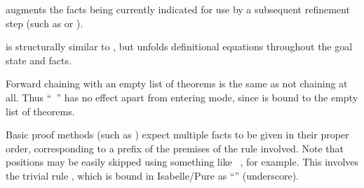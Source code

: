 \begin{isabellebody}
\begin{isamarkuptext}
\begin{descr}
  \item [\hyperlink{command.using}{\mbox{\isa{\isacommand{using}}}}~\isa{{\isachardoublequote}b\isactrlsub {\isadigit{1}}\ {\isasymdots}\ b\isactrlsub n{\isachardoublequote}}] augments
  the facts being currently indicated for use by a subsequent
  refinement step (such as \hyperlink{command.apply}{\mbox{}} or \hyperlink{command.proof}{\mbox{}}).
  
  \item [\hyperlink{command.unfolding}{\mbox{\isa{\isacommand{unfolding}}}}~\isa{{\isachardoublequote}b\isactrlsub {\isadigit{1}}\ {\isasymdots}\ b\isactrlsub n{\isachardoublequote}}] is
  structurally similar to \hyperlink{command.using}{\mbox{}}, but unfolds definitional
  equations  throughout the goal state
  and facts.

  \end{descr}

  Forward chaining with an empty list of theorems is the same as not
  chaining at all.  Thus ``\hyperlink{command.from}{\mbox{}}~'' has no
  effect apart from entering  mode, since
  \hyperlink{fact.nothing}{\mbox{}} is bound to the empty list of theorems.

  Basic proof methods (such as \hyperlink{method.rule}{\mbox{}}) expect multiple
  facts to be given in their proper order, corresponding to a prefix
  of the premises of the rule involved.  Note that positions may be
  easily skipped using something like \hyperlink{command.from}{\mbox{}}~, for example.  This involves the trivial rule
  , which is bound in Isabelle/Pure as
  ``\hyperlink{fact.underscore}{\mbox{\isa{{\isacharunderscore}}}}'' (underscore).


\end{isamarkuptext}
\end{isabellebody}
